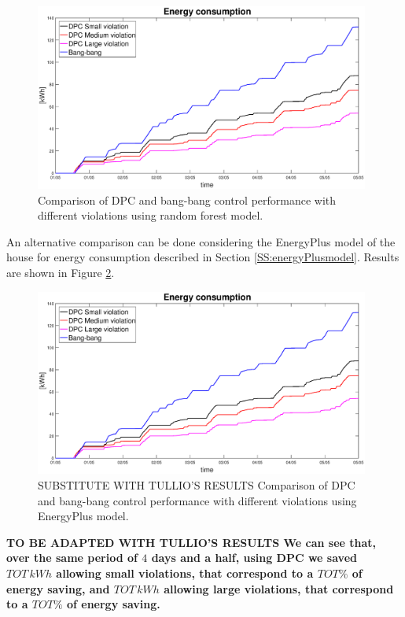 \begin{figure}[h!]
	\begin{center}
		\includegraphics[width=26pc]{figures/Energy_all.eps}
	\end{center}
	\caption{Comparison of DPC and bang-bang control performance with different violations using random forest model.}
	\label{F:comparison_all_energy}
\end{figure}
An alternative comparison can be done considering the EnergyPlus model of the house for energy consumption described in Section \ref{SS:energyPlusmodel}. Results are shown in Figure \ref{F:comparison_all_energy_E+}.
\begin{figure}[h!]
	\begin{center}
		\includegraphics[width=26pc]{figures/Energy_all.eps}
	\end{center}
	\caption{SUBSTITUTE WITH TULLIO'S RESULTS Comparison of DPC and bang-bang control performance with different violations using EnergyPlus model.}
	\label{F:comparison_all_energy_E+}
\end{figure}
\textbf{TO BE ADAPTED WITH TULLIO'S RESULTS We can see that, over the same period of $4$ days and a half, using DPC we saved $TOT\, kWh$ allowing small violations, that correspond to a $TOT\%$ of energy saving, and $TOT\, kWh$ allowing large violations, that correspond to a $TOT\%$ of energy saving.}






